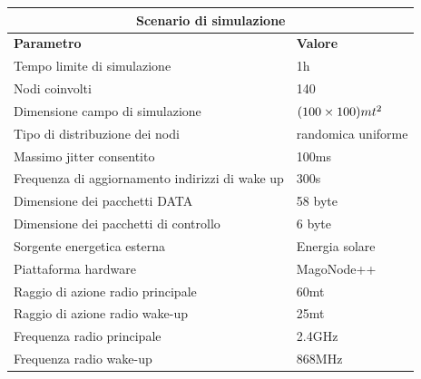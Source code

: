 \documentclass[binding=0.6cm,TFA]{sapthesis}
\begin{document}
\begin{table}[h]
    \setlength\doublerulesep{1mm} 
    \begin{tabular}{ |p{8cm}|p{4cm}|  }
        \hline
        \multicolumn{2}{|c|}{\textbf{Scenario di simulazione}}                                      \\
        \hline \hline
        \textbf{Parametro}                              & \textbf{Valore}                           \\
        \hline
        Tempo limite di simulazione                     & 1h                                        \\
        Nodi coinvolti                                  & 140                                       \\
        Dimensione campo di simulazione                 & $(100 \times 100) mt\textsuperscript{2}$  \\
        Tipo di distribuzione dei nodi                  & randomica uniforme                        \\
        Massimo jitter consentito                       & 100ms                                     \\
        Frequenza di aggiornamento indirizzi di wake up & 300s                                      \\
        Dimensione dei pacchetti DATA                   & 58 byte                                   \\
        Dimensione dei pacchetti di controllo           & 6 byte                                    \\
        Sorgente energetica esterna                     & Energia solare                            \\
        Piattaforma hardware                            & MagoNode++                                \\
        Raggio di azione radio principale               & 60mt                                      \\
        Raggio di azione radio wake-up                  & 25mt                                      \\
        Frequenza radio principale                      & 2.4GHz                                    \\
        Frequenza radio wake-up                         & 868MHz                                    \\

\end{tabular}
\end{table}
\end{document}

